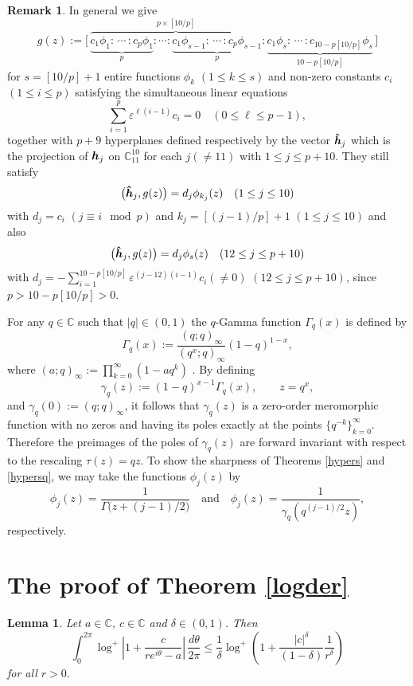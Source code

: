 \documentclass{amsart}
\newcommand{\C}{\mathbb{C}}
\newtheorem{lemma}[theorem]{Lemma}
\theoremstyle{definition}
\newtheorem{remark}[theorem]{Remark}
\numberwithin{equation}{section}
\numberwithin{theorem}{section}
\begin{document}
\begin{remark}
In general we give
$$
g(z):=\bigl[\, \overbrace{\underbrace{c_1\phi_1: \, \cdots \,
:c_{p}\phi_1}_{p}: \cdots : \underbrace{c_1\phi_{s-1}: \, \cdots
\, :c_{p}\phi_{s-1}}_{p}}^{p\times [10/p]}: \underbrace{c_1\phi_s:
\, \cdots \, :c_{10-p[10/p]}\phi_s}_{10-p[10/p]} \, \bigr]
$$
for $s=[10/p]+1$ entire functions $\phi_k$ $(1\leq k\leq s)$ and
non-zero constants $c_i$ $(1\leq i\leq p)$ satisfying the
simultaneous linear equations
$$
\sum_{i=1}^p \varepsilon^{\ell (i-1)}c_i=0 \quad (0\leq \ell \leq p-1),
$$
together with $p+9$ hyperplanes defined respectively by the vector
$\mbox{\boldmath$\hat{h}$}_{j}$ which is the projection of
$\mbox{\boldmath$h$}_{j}$ on $\mathbb{C}^{10}_{11}$ for each $j
(\neq 11)$ with $1\leq j\leq p+10$. They still satisfy
$$
\bigl(\mbox{\boldmath$\hat{h}$}_{j}, g(z)\bigr)=d_j\phi_{k_j}(z)
\quad (1\leq j\leq 10)
$$
with $d_j=c_i$ $(j\equiv i \mod p)$ and $k_j=[(j-1)/p]+1$ $(1\leq
j\leq 10)$ and also
$$
\bigl(\mbox{\boldmath$\hat{h}$}_{j}, g(z)\bigr)= d_j\phi_{s}(z)
\quad (12\leq j\leq p+10)
$$
with $d_j=-\sum_{i=1}^{10-p[10/p]}
\varepsilon^{(j-12)(i-1)}c_i(\neq 0)$ $(12\leq j \leq p+10)$,
since $p>10-p[10/p]>0$.
\end{remark}


For any $q\in\C$ such that $|q|\in(0,1)$ the $q$-Gamma function
$\Gamma_q(x)$ is defined by
    $$
    \Gamma_q(x):=\frac{(q;q)_\infty}{(q^x;q)_\infty}(1-q)^{1-x},
    $$
where $(a;q)_\infty:=\prod_{k=0}^\infty(1-aq^k)$
\cite{andrewsar:99}. By defining
    $$
    \gamma_q(z):=(1-q)^{x-1}\Gamma_q(x), \qquad z=q^x,
    $$
and $\gamma_q(0):=(q;q)_\infty$, it follows that $\gamma_q(z)$ is
a zero-order meromorphic function with no zeros and having its
poles exactly at the points $\{q^{-k}\}_{k=0}^\infty$. Therefore
the preimages of the poles of $\gamma_q(z)$ are forward invariant
with respect to the rescaling $\tau(z)=qz$. To show the sharpness
of Theorems \ref{hypers} and \ref{hypersq}, we may take the
functions $\phi_j(z)$ by
    $$
    \phi_j(z)=\frac{1}{\Gamma \bigl(z+(j-1)/2\bigr)} \quad \text{and}
    \quad \phi_j(z) =\frac{1}{\gamma_q(q^{(j-1)/2}z)},
    $$
respectively.


\section{The proof of Theorem \ref{logder}}\label{section_lemma}



\begin{lemma}\label{ineqlemma}
Let $a\in\C$, $c\in\C$ and $\delta\in(0,1)$. Then
    \begin{equation}\label{assertn}
    \int_0^{2\pi}\log^{+}\left|1+\frac{c}{re^{i\theta}-a}\right|\,\frac{d\theta}{2\pi} \leq
    \frac{1}{\delta}\log^{+}\left(1+\frac{|c|^\delta}{(1-\delta)}\frac{1}{r^\delta}\right)
    \end{equation}
for all $r>0.$
\end{lemma}
\end{document}
